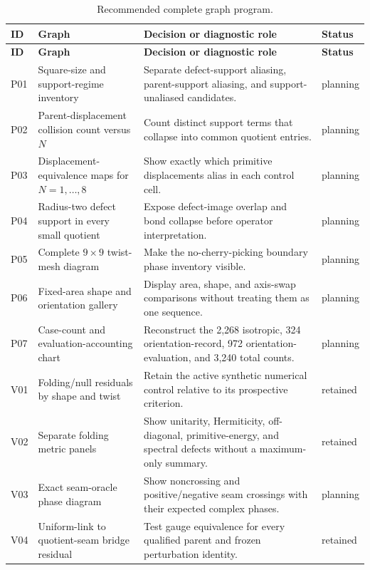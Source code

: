 \documentclass[11pt]{article}
\begin{document}
\footnotesize
\begin{longtable}{@{}L{10mm}L{42mm}L{65mm}L{18mm}@{}}
\caption{Recommended complete graph program.}\label{tab:recommended-figures}\\
\toprule
\textbf{ID} & \textbf{Graph} & \textbf{Decision or diagnostic role} & \textbf{Status} \\
\midrule
\endfirsthead
\toprule
\textbf{ID} & \textbf{Graph} & \textbf{Decision or diagnostic role} & \textbf{Status} \\
\midrule
\endhead
P01 & Square-size and support-regime inventory & Separate defect-support aliasing,
parent-support aliasing, and support-unaliased candidates. & planning \\
P02 & Parent-displacement collision count versus $N$ & Count distinct support terms
that collapse into common quotient entries. & planning \\
P03 & Displacement-equivalence maps for $N=1,\ldots,8$ & Show exactly which primitive
displacements alias in each control cell. & planning \\
P04 & Radius-two defect support in every small quotient & Expose defect-image overlap
and bond collapse before operator interpretation. & planning \\
P05 & Complete $9\times9$ twist-mesh diagram & Make the no-cherry-picking boundary
phase inventory visible. & planning \\
P06 & Fixed-area shape and orientation gallery & Display area, shape, and axis-swap
comparisons without treating them as one sequence. & planning \\
P07 & Case-count and evaluation-accounting chart & Reconstruct the 2,268 isotropic,
324 orientation-record, 972 orientation-evaluation, and 3,240 total counts. & planning \\
V01 & Folding/null residuals by shape and twist & Retain the active synthetic numerical
control relative to its prospective criterion. & retained \\
V02 & Separate folding metric panels & Show unitarity, Hermiticity, off-diagonal,
primitive-energy, and spectral defects without a maximum-only summary. & retained \\
V03 & Exact seam-oracle phase diagram & Show noncrossing and positive/negative seam
crossings with their expected complex phases. & planning \\
V04 & Uniform-link to quotient-seam bridge residual & Test gauge equivalence for every
qualified parent and frozen perturbation identity. & retained \\

\end{longtable}
\end{document}
